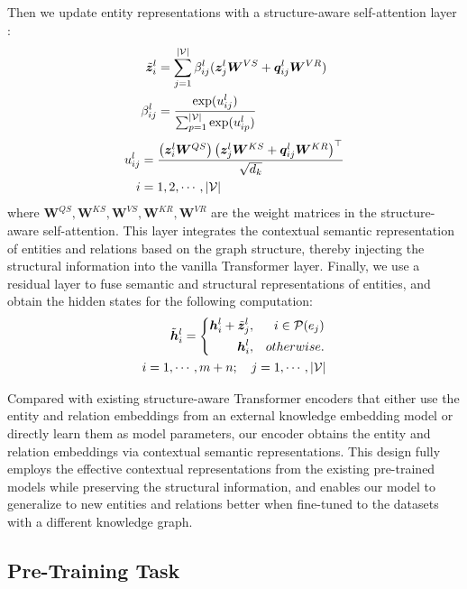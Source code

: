 \documentclass[11pt,a4paper]{article}
\begin{document}
Then we update entity representations with a structure-aware self-attention layer \cite{shaw2018relative}:
\begin{align}
    \tilde{\bm{z}}_{i}^l & = \sum_{j=1}^{|\mathcal{V}|}\beta_{ij}^l (\bm{z}_j^l \bm{W}^{VS} + \bm{q}_{ij}^l \bm{W}^{VR}) \notag \\
    \beta_{ij}^{l} & = \frac{\exp(u_{ij}^{l})}{\sum_{p=1}^{|\mathcal{V}|} \exp(u_{ip}^{l})}
\end{align}
\begin{align}
    u_{ij}^l & = \frac{\left(\bm{z}_i^{l}\bm{W}^{QS}\right)\left(\bm{z}_j^{l}\bm{W}^{KS}+\bm{q}_{ij}^{l}\bm{W}^{KR}\right)^\top}{\sqrt{d_k}} \notag \\
    i & = 1,2,\cdots,|\mathcal{V}| \notag
\end{align}
where $\bm{W}^{QS},\bm{W}^{KS},\bm{W}^{VS},\bm{W}^{KR},\bm{W}^{VR}$ are the weight matrices in the structure-aware self-attention. This layer 
integrates the contextual semantic representation of entities and relations based on the graph structure, thereby injecting the structural information into the vanilla Transformer layer. Finally, we use a residual layer to fuse semantic and structural representations of entities, and obtain the hidden states for the following computation:
\begin{eqnarray}
\tilde{\bm{h}}_{i}^l = \left\{
\begin{aligned}
\bm{h}_i^l + \tilde{\bm{z}}_j^l & , & i \in \mathcal{P}(e_j) \\
\bm{h}_i^l & , & otherwise.
\end{aligned}
\right. \\
i = 1,\cdots,m+n;\quad j=1,\cdots,|\mathcal{V}| \notag
\end{eqnarray}

Compared with existing structure-aware Transformer encoders \cite{zhu2019structaware,song2020structure} that either use the entity and relation embeddings from an external knowledge embedding model or directly learn them as model parameters, our encoder obtains the entity and relation embeddings via contextual semantic representations. This design fully employs the effective contextual representations from the existing pre-trained models while preserving the structural information, and enables our model to generalize to new entities and relations better when fine-tuned to the datasets with a different knowledge graph.




\subsection{Pre-Training Task}
\label{sec:pretrain}
\end{document}
